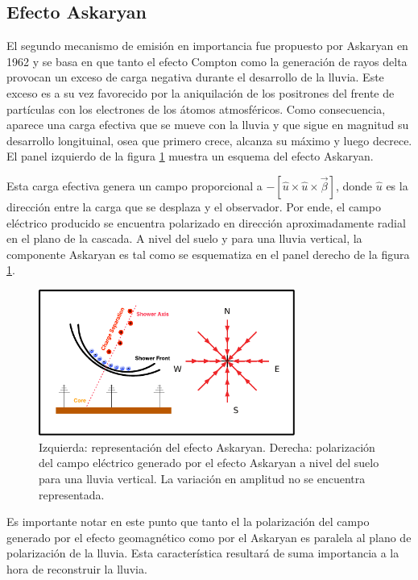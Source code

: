 \subsection{Efecto Askaryan}
\label{sbsc:ask_emision}
	
	El segundo mecanismo de emisión en importancia fue propuesto por Askaryan en 1962 \cite{askaryan1962} y se basa en que tanto el efecto Compton como la generaci\'on de rayos delta provocan un exceso de carga negativa durante el desarrollo de la lluvia.
	Este exceso es a su vez favorecido por la aniquilaci\'on de los positrones del frente de part\'iculas con los electrones de los \'atomos atmosf\'ericos. 
	Como consecuencia, aparece una carga efectiva que se mueve con la lluvia y que sigue en magnitud su desarrollo longituinal, osea que primero crece, alcanza su m\'aximo y luego decrece.
	El panel izquierdo de la figura \ref{fig:ask_sketch} muestra un esquema del efecto Askaryan.
	
	Esta carga efectiva genera un campo proporcional a $-\left[\hat u \times \hat u \times \vec\beta\right]$\cite{cite:zhsPhysRevD}, donde $\hat u$ es la direcci\'on entre la carga que se desplaza y el observador\cite{jackson:1998}.
	Por ende, el campo eléctrico producido se encuentra polarizado en dirección aproximadamente radial en el plano de la cascada.
	A nivel del suelo y para una lluvia vertical, la componente Askaryan es tal como se esquematiza en el panel derecho de la figura \ref{fig:ask_sketch}.
	\begin{figure}[ht!]
		\centering
		\includegraphics[width=0.75\textwidth]{fig/EASRadio/ask_sketch}
		\caption{\label{fig:ask_sketch} Izquierda: representaci\'on del efecto Askaryan.
		Derecha: polarización del campo eléctrico generado por el efecto Askaryan a nivel del suelo para una lluvia vertical. La variaci\'on en amplitud no se encuentra representada.}
	\end{figure}
	
	Es importante notar en este punto que tanto el la polarizaci\'on del campo generado por el efecto geomagn\'etico como por el Askaryan es paralela al plano de polarizaci\'on de la lluvia.
	Esta caracter\'istica resultar\'a de suma importancia a la hora de reconstruir la lluvia.
	
